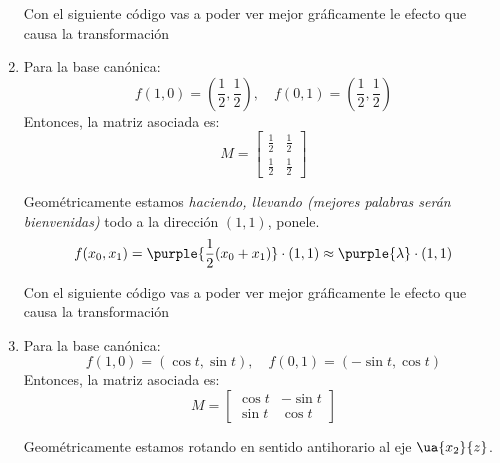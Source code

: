 \begin{enumerate}[label=(\alph*)]
\begin{minipage}{0.35\textwidth}
        \end{minipage}

        Con el siguiente código vas a poder ver mejor gráficamente le efecto que causa la transformación
        \copyPaste

  \item Para la base canónica:
        $$
          f(1,0) = \left( \frac{1}{2}, \frac{1}{2} \right), \quad f(0,1) = \left( \frac{1}{2}, \frac{1}{2} \right)
        $$
        Entonces, la matriz asociada es:
        $$
          M =
          \begin{bmatrix}
            \frac{1}{2} & \frac{1}{2} \\
            \frac{1}{2} & \frac{1}{2}
          \end{bmatrix}
        $$

        Geométricamente estamos \textit{haciendo, llevando {\tiny (mejores palabras serán bienvenidas)}} todo a la dirección $(1,1)$, ponele.
        $$
          f(x_0,x_1) = \purple{\frac{1}{2}(x_0 + x_1)} \cdot (1,1) \approx \purple{\lambda} \cdot (1,1)
        $$

        Con el siguiente código vas a poder ver mejor gráficamente le efecto que causa la transformación
        \copyPaste

  \item Para la base canónica:
        $$
          f(1,0) = (\cos t, \sin t), \quad f(0,1) = (-\sin t, \cos t)
        $$
        Entonces, la matriz asociada es:
        $$
          M =
          \begin{bmatrix}
            \cos t & -\sin t \\
            \sin t & \cos t
          \end{bmatrix}
        $$
        \begin{minipage}{0.65\textwidth}
          Geométricamente estamos rotando en sentido antihorario al eje $\ua{x_2}{z}$.
        \end{minipage}
        \begin{minipage}{0.35\textwidth}
        \end{minipage}
\end{enumerate}

\begin{aportes}
  \item {}
  \item {}
\end{aportes}
